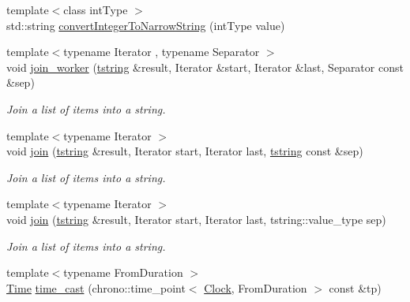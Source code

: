 \begin{DoxyCompactItemize}
\item 
{\footnotesize template$<$class int\-Type $>$ }\\std\-::string \hyperlink{namespacelog4cplus_1_1helpers_a9c1047134c3478ca12f399ea5471fbaf}{convert\-Integer\-To\-Narrow\-String} (int\-Type value)
\item 
{\footnotesize template$<$typename Iterator , typename Separator $>$ }\\void \hyperlink{namespacelog4cplus_1_1helpers_a343d1a0434df940daf84bf5472b723ab}{join\-\_\-worker} (\hyperlink{namespacelog4cplus_a3c9287f6ebcddc50355e29d71152117b}{tstring} \&result, Iterator \&start, Iterator \&last, Separator const \&sep)
\begin{DoxyCompactList}\small\item\em Join a list of items into a string. \end{DoxyCompactList}\item 
{\footnotesize template$<$typename Iterator $>$ }\\void \hyperlink{namespacelog4cplus_1_1helpers_a3b31785ea378484be4b279adbe6ba0a4}{join} (\hyperlink{namespacelog4cplus_a3c9287f6ebcddc50355e29d71152117b}{tstring} \&result, Iterator start, Iterator last, \hyperlink{namespacelog4cplus_a3c9287f6ebcddc50355e29d71152117b}{tstring} const \&sep)
\begin{DoxyCompactList}\small\item\em Join a list of items into a string. \end{DoxyCompactList}\item 
{\footnotesize template$<$typename Iterator $>$ }\\void \hyperlink{namespacelog4cplus_1_1helpers_a4897be2f5dfa250fb216f7b072502e33}{join} (\hyperlink{namespacelog4cplus_a3c9287f6ebcddc50355e29d71152117b}{tstring} \&result, Iterator start, Iterator last, tstring\-::value\-\_\-type sep)
\begin{DoxyCompactList}\small\item\em Join a list of items into a string. \end{DoxyCompactList}\item 
{\footnotesize template$<$typename From\-Duration $>$ }\\\hyperlink{namespacelog4cplus_1_1helpers_af05d40c37e1cccf9d11d0cbb7426bcd4}{Time} \hyperlink{namespacelog4cplus_1_1helpers_aa9b5ff03f853d69b72ec485f051163ee}{time\-\_\-cast} (chrono\-::time\-\_\-point$<$ \hyperlink{namespacelog4cplus_1_1helpers_a9271a4862d21d1ec6e02b5d511bca6ae}{Clock}, From\-Duration $>$ const \&tp)
\item 

\end{DoxyCompactItemize}
